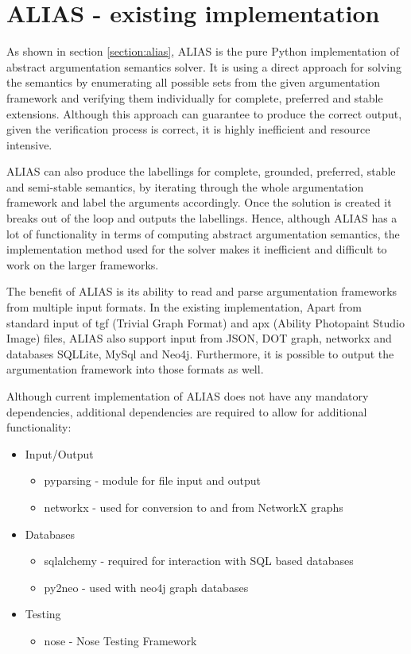 \section{ALIAS - existing implementation}
As shown in section \ref{section:alias}, ALIAS \citep{alias} is the pure Python implementation of abstract argumentation semantics solver. It is using a direct approach for solving the semantics by enumerating all possible sets from the given argumentation framework and verifying them individually for complete, preferred and stable extensions. Although this approach can guarantee to produce the correct output, given the verification process is correct, it is highly inefficient and resource intensive. 

ALIAS can also produce the labellings for complete, grounded, preferred, stable and semi-stable semantics, by iterating through the whole argumentation framework and label the arguments accordingly. Once the solution is created it breaks out of the loop and outputs the labellings. Hence, although ALIAS has a lot of functionality in terms of computing abstract argumentation semantics, the implementation method used for the solver makes it inefficient and difficult to work on the larger frameworks. 

The benefit of ALIAS is its ability to read and parse argumentation frameworks from multiple input formats. In the existing implementation, Apart from standard input of tgf (Trivial Graph Format) and apx (Ability Photopaint Studio Image) files, ALIAS also support input from JSON, DOT graph, networkx and databases SQLLite, MySql and Neo4j. Furthermore, it is possible to output the argumentation framework into those formats as well.

Although current implementation of ALIAS does not have any mandatory dependencies, additional dependencies are required to allow for additional functionality:
\begin{itemize}
	\item Input/Output
	\begin{itemize}
		\item pyparsing - module for file input and output
		\item networkx - used for conversion to and from NetworkX graphs 
	\end{itemize}
	\item Databases
	\begin{itemize}
		\item sqlalchemy - required for interaction with SQL based databases
		\item py2neo - used with neo4j graph databases
	\end{itemize}
	\item Testing
	\begin{itemize}
		\item nose - Nose Testing Framework
	\end{itemize}
\end{itemize}

